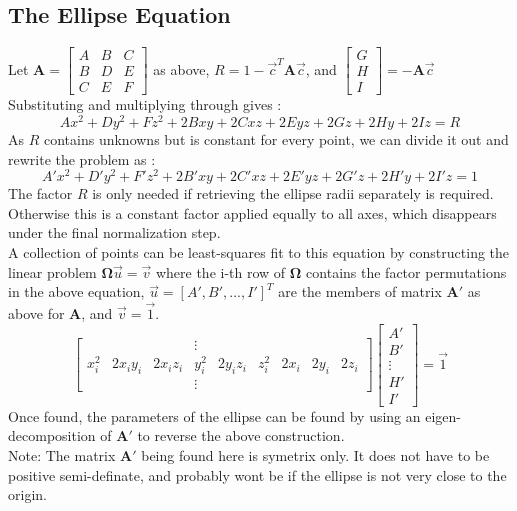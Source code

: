 \documentclass{article}
\def\mat#1{\mathbf{#1}}
\begin{document}
\subsection{The Ellipse Equation}
Let $\mat{A} = \left[ \begin{smallmatrix}
A & B & C \\
B & D & E \\
C & E & F
\end{smallmatrix} \right]$ as above, 
$R = 1 - \vec{c}^T\mat{A}\vec{c}$, and $\left[\begin{smallmatrix}
G\\H\\I \end{smallmatrix}\right] = -\mat{A}\vec{c}$
\\
Substituting and multiplying through gives :
\\
\begin{equation}
Ax^2 + Dy^2 + Fz^2 + 2Bxy + 2Cxz +2Eyz + 2Gz + 2Hy + 2Iz = R
\end{equation}
As $R$ contains unknowns but is constant for every point, we can divide it out and rewrite the problem as :
\begin{equation}
A'x^2 + D'y^2 + F'z^2 + 2B'xy + 2C'xz +2E'yz + 2G'z + 2H'y + 2I'z = 1
\end{equation}
The factor $R$ is only needed if retrieving the ellipse radii separately
is required. Otherwise this is a constant factor applied equally
to all axes, which disappears under the final normalization step.
\\
A collection of points can be least-squares fit to this equation
by constructing the linear problem
$\mat{\Omega}\vec{u} = \vec{v}$ where the i-th row of $\mat{\Omega}$ contains the factor permutations in
the above equation, $\vec{u} =
\left[A',B',...,I'\right]^T$ are the members of matrix $\mat{A}'$ as above for $\mat{A}$, and $\vec{v}=\vec{1}$.
\begin{equation}
\left[ \begin{matrix}
& & & \vdots \\
x_i^2 & 2x_iy_i & 2x_iz_i & y_i^2 & 2y_iz_i & z_i^2 & 2x_i & 2y_i & 2z_i \\
& & & \vdots  
\end{matrix}\right]
\left[ \begin{matrix} A'\\ B'\\ \vdots\\ H'\\ I' \end{matrix}\right] = \vec{1}
\end{equation}
Once found, the parameters of the ellipse can be found by using an 
eigen-decomposition of $\mat{A}'$ to reverse the above construction.
\\
Note: The matrix $\mat{A'}$ being found here is symetrix only. It does
not have to be positive semi-definate, and probably wont be if the
ellipse is not very close to the origin.
%
\end{document}
